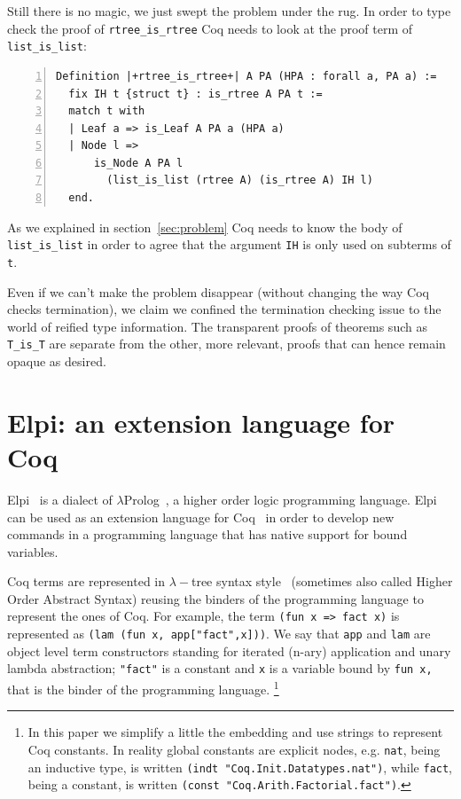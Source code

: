 \documentclass[sigplan,10pt,review]{acmart}\settopmatter{printfolios=true,printccs=false,printacmref=false}
\begin{document}
Still there is no magic, we just swept the problem under the rug.
In order to type check the proof
of \lstinline+rtree_is_rtree+ Coq needs to look at the
proof term of \lstinline+list_is_list+:

\begin{minipage}{\textwidth}\begin{lstlisting}[numbers=left]
Definition |+rtree_is_rtree+| A PA (HPA : forall a, PA a) :=
  fix IH t {struct t} : is_rtree A PA t :=
  match t with
  | Leaf a => is_Leaf A PA a (HPA a)
  | Node l =>
      is_Node A PA l
        (list_is_list (rtree A) (is_rtree A) IH l)
  end.
\end{lstlisting}\end{minipage}

\noindent
As we explained in section~\ref{sec:problem} Coq needs to know the
body of  \lstinline+list_is_list+ in order to agree that the argument
\lstinline+IH+ is only used on subterms of \lstinline+t+.

Even if we can't make the problem disappear (without changing the way Coq
checks termination), we claim we confined the termination checking issue
to the world of reified type information. The transparent proofs of
theorems such as \lstinline+T_is_T+ are separate from the other, more
relevant, proofs that can hence remain opaque as desired.

\section{Elpi: an extension language for Coq} %
\label{sec:elpilang}

Elpi~\cite{dunchev:hal-01176856} is a dialect of
$\lambda$Prolog~\cite{miller_nadathur_2012}, a higher order logic
programming language. Elpi can be used as an extension language for
Coq~\cite{tassi:hal-01637063} in order to develop new commands in a programming
language that has native support for bound variables.

Coq terms are represented in $\lambda-$tree syntax
style~\cite{10.1007/3-540-44957-4_16} (sometimes also called
Higher Order Abstract Syntax) reusing the binders of the programming
language to represent the ones of Coq.
For example, the
term \lstinline+(fun x => fact x)+ is represented as
\lstinline+(lam (fun x, app["fact",x]))+. 
We say that \lstinline+app+ and \lstinline+lam+ are object level term
constructors standing for iterated (n-ary) application and unary lambda
abstraction; \lstinline+"fact"+ is a constant and \lstinline+x+ is a
variable bound by \lstinline+fun x,+ that is the binder
of the programming language.  \footnote{In this paper we simplify
a little the embedding and use strings to represent Coq constants.
In reality
global constants are explicit nodes, e.g. \lstinline+nat+,
being an inductive type,
is written \lstinline+(indt "Coq.Init.Datatypes.nat")+,
while \lstinline+fact+, being a constant,
is written \lstinline+(const "Coq.Arith.Factorial.fact")+.}
\end{document}
